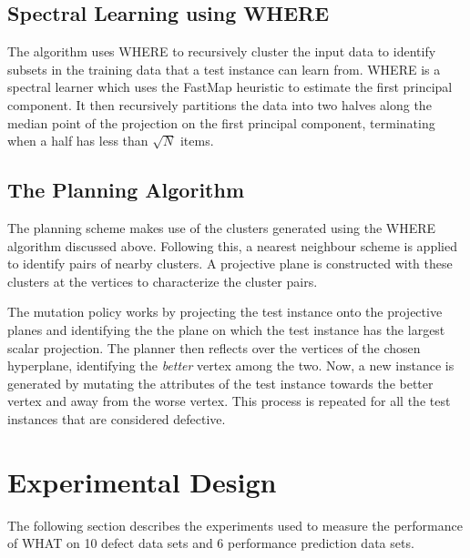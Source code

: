 \documentclass[conference]{IEEEtran}
\begin{document}
\subsection{Spectral Learning using WHERE}
The algorithm uses WHERE to recursively cluster the input data to identify subsets in the training data that a test instance can learn from. WHERE is a spectral learner which uses the FastMap heuristic to estimate the first principal component. It then recursively partitions the data into two halves along the median point of the projection on the first principal component, terminating when a half has less than $\sqrt{N}$ items.   

\subsection{The Planning Algorithm}
The planning scheme makes use of the clusters generated using the WHERE algorithm discussed above. Following this, a nearest neighbour scheme is applied to identify pairs of nearby clusters. A projective plane is constructed with these clusters at the vertices to characterize the cluster pairs.

The mutation policy works by projecting the test instance onto the projective planes and identifying the the plane on which the test instance has the largest scalar projection. The planner then reflects over the vertices of the chosen hyperplane, identifying the \textit{better} vertex among the two. Now, a new instance is generated by mutating the attributes of the test instance towards the better vertex and away from the worse vertex. This process is repeated for all the test instances that are considered defective.
\section{Experimental Design}
The following section describes the experiments used to measure the performance of WHAT on 10 defect data sets and 6 performance prediction data sets.
\end{document}
